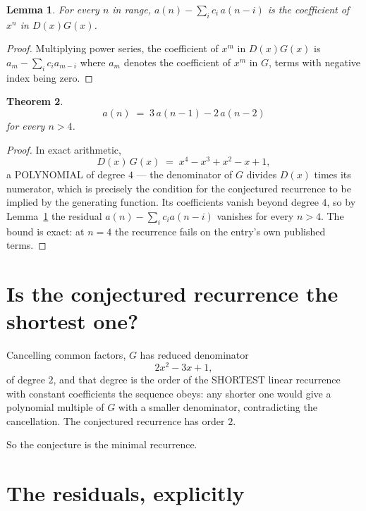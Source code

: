 \documentclass[11pt,a4paper]{article}
\theoremstyle{plain}
\newtheorem{theorem}{Theorem}
\newtheorem{lemma}[theorem]{Lemma}
\theoremstyle{definition}
\begin{document}
\begin{lemma}\label{lem:key}
For every $n$ in range, $a(n)-\sum_i c_i\,a(n-i)$ is the coefficient of $x^{n}$ in
$D(x)G(x)$.
\end{lemma}

\begin{proof}
Multiplying power series, the coefficient of $x^{m}$ in $D(x)G(x)$ is
$a_m-\sum_i c_i a_{m-i}$ where $a_m$ denotes the coefficient of $x^{m}$ in $G$, terms with
negative index being zero.
\end{proof}

\begin{theorem}
\[
a(n)\;=\;3\,a(n-1) - 2\,a(n-2)
\]
for every $n>4$.
\end{theorem}

\begin{proof}
In exact arithmetic,
\[
D(x)\,G(x)\;=\;x^{4} - x^{3} + x^{2} - x + 1,
\]
a POLYNOMIAL of degree $4$ --- the denominator of $G$ divides $D(x)$ times its numerator,
which is precisely the condition for the conjectured recurrence to be implied by the
generating function. Its coefficients vanish beyond degree $4$, so by
Lemma~\ref{lem:key} the residual $a(n)-\sum_ic_ia(n-i)$ vanishes for every
$n>4$. The bound is exact: at $n=4$ the recurrence fails on the entry's own published terms.
\end{proof}

\section{Is the conjectured recurrence the shortest one?}

Cancelling common factors, $G$ has reduced denominator
\[
2 x^{2} - 3 x + 1,
\]
of degree $2$, and that degree is the order of the SHORTEST linear recurrence with
constant coefficients the sequence obeys: any shorter one would give a polynomial multiple of
$G$ with a smaller denominator, contradicting the cancellation. The conjectured recurrence has
order $2$.

So the conjecture is the minimal recurrence.

\section{The residuals, explicitly}
\end{document}
